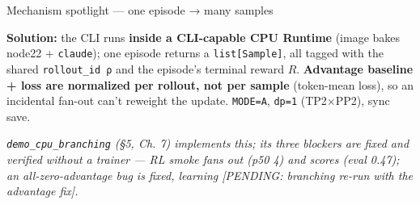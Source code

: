 \documentclass[
  10pt,
  ignorenonframetext,
  aspectratio=169,
  t]{beamer}
\begin{document}
\begin{frame}{Mechanism spotlight --- one episode → many
samples}
\begin{center}
{%
}
\end{center}

\textbf{Solution:} the CLI runs \textbf{inside a CLI-capable CPU
Runtime} (image bakes node22 + \texttt{claude}); one episode returns a
\texttt{list{[}Sample{]}}, all tagged with the shared
\texttt{rollout\_id\ ρ} and the episode's terminal reward \(R\).
\textbf{Advantage baseline + loss are normalized per rollout, not per
sample} (token-mean loss), so an incidental fan-out can't reweight the
update. \texttt{MODE=A}, \texttt{dp=1} (TP2×PP2), sync save.

\emph{\texttt{demo\_cpu\_branching} (§5, Ch. 7) implements this; its
three blockers are fixed and verified without a trainer --- RL smoke
fans out (p50 4) and scores (eval 0.47); an all-zero-advantage bug is
fixed, learning {[}PENDING: branching re-run with the advantage fix{]}.}
\end{frame}
\end{document}
